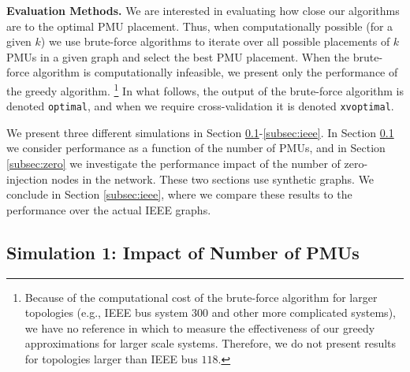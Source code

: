 \textbf{Evaluation Methods.}
We are interested in evaluating how close our algorithms are to the optimal PMU placement. 
Thus, when computationally possible (for a given $k$) we use brute-force algorithms to iterate over all possible placements of $k$ PMUs in a given graph and select the best PMU placement. 
When the brute-force algorithm is computationally infeasible, we present only the performance of the greedy algorithm.
{\footnote {\small Because of the computational cost of the brute-force algorithm for larger topologies (e.g., IEEE bus system $300$ and other more complicated systems),
we have no reference in which to measure the effectiveness of our greedy approximations for larger scale systems. 
Therefore, we do not present results for topologies larger than IEEE bus $118$. }}
In what follows, the output of the brute-force algorithm is denoted {\tt optimal}, and when we require cross-validation it is denoted {\tt xvoptimal}.


We present three different simulations in Section \ref{subsec:synth}-\ref{subsec:ieee}. 
In Section \ref{subsec:synth} we consider performance as a function of the number of PMUs, and in Section \ref{subsec:zero} we investigate the performance impact of the number of zero-injection nodes in the network. These two sections use synthetic graphs. We conclude in Section \ref{subsec:ieee}, where we compare these results to the performance over the actual IEEE graphs.

\subsection{Simulation 1: Impact of Number of PMUs}
\label{subsec:synth}

